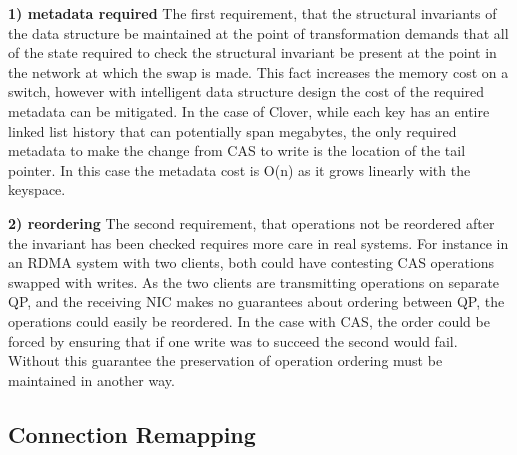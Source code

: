 

 

\textbf{1) metadata required} The first requirement, that the structural invariants
of the data structure be maintained at the point of transformation demands that
all of the state required to check the structural invariant be present at the
point in the network at which the swap is made. This fact increases the memory
cost on a switch, however with intelligent data structure design the cost of the
required metadata can be mitigated. In the case of Clover, while each key has
an entire linked list history that can potentially span megabytes, the only
required metadata to make the change from CAS to write is the location of the
tail pointer. In this case the metadata cost is O(n) as it grows linearly with
the keyspace.

\textbf{2) reordering} The second requirement, that operations not be reordered
after the invariant has been checked requires more care in real systems. For
instance in an RDMA system with two clients, both could have contesting CAS
operations swapped with writes. As the two clients are transmitting operations on
separate QP, and the receiving NIC makes no guarantees about ordering between QP,
the operations could easily be reordered. In the case with CAS, the order could
be forced by ensuring that if one write was to succeed the second would fail.
Without this guarantee the preservation of operation ordering must be maintained
in another way.

\subsection{Connection Remapping}


